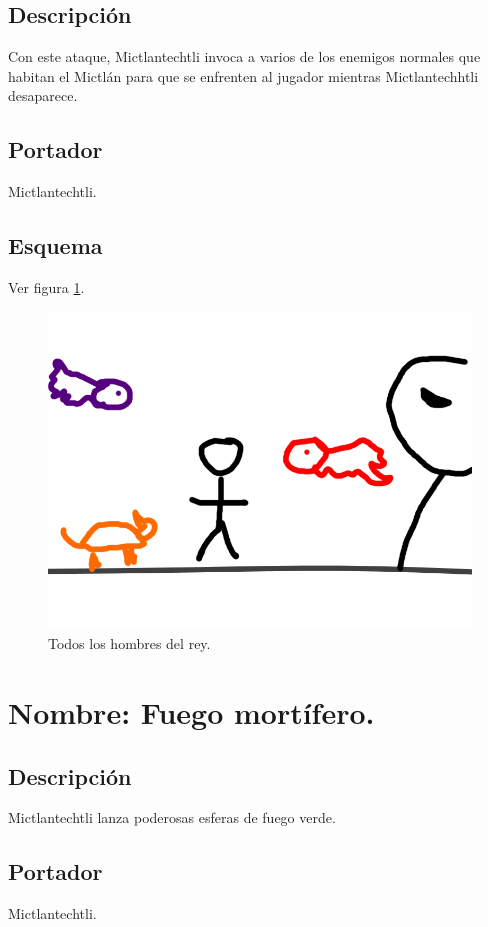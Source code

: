 \subsection{Descripción}
Con este ataque,  Mictlantechtli invoca a varios de los enemigos normales que habitan el Mictlán para que se enfrenten al jugador mientras  Mictlantechhtli desaparece.
\subsection{Portador}
Mictlantechtli.
\subsection{Esquema}
			Ver figura \ref{fig:rey}.
			\begin{figure}
				\centering
				\includegraphics[height=0.2 \textheight]{Imagenes/rey}
				\caption{Todos los hombres del rey.}
				\label{fig:rey}
			\end{figure}
\section{Nombre: Fuego mortífero.} \label{hab.FuegoMor}
\subsection{Descripción}
Mictlantechtli  lanza poderosas esferas de fuego verde.
\subsection{Portador}
Mictlantechtli.	
